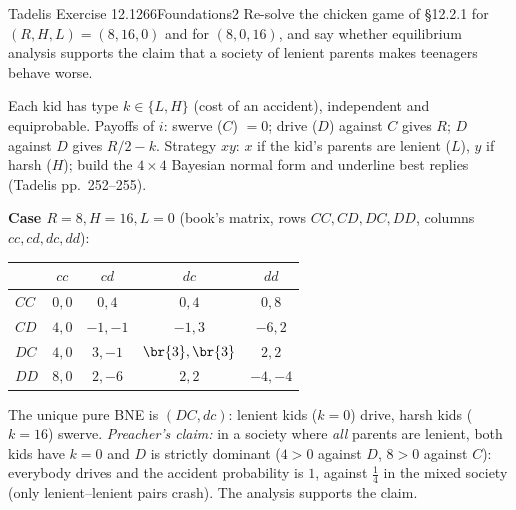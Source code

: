 \begin{exsol}{Tadelis Exercise 12.1}{266}{Foundations}{2}
\asked Re-solve the chicken game of \S12.2.1 for $(R,H,L)=(8,16,0)$ and for $(8,0,16)$, and say
whether equilibrium analysis supports the claim that a society of lenient parents makes
teenagers behave worse.

\method Each kid has type $k\in\{L,H\}$ (cost of an accident), independent and equiprobable.
Payoffs of $i$: swerve ($C$) $=0$; drive ($D$) against $C$ gives $R$; $D$ against $D$ gives
$R/2-k$. Strategy $xy$: $x$ if the kid's parents are lenient ($L$), $y$ if harsh ($H$); build the
$4\times4$ Bayesian normal form and underline best replies (Tadelis pp.~252--255).

\solution
\textbf{Case $R=8,H=16,L=0$} (book's matrix, rows $CC,CD,DC,DD$, columns $cc,cd,dc,dd$):
\begin{center}\small
\begin{tabular}{l|cccc}
 & $cc$ & $cd$ & $dc$ & $dd$\\\hline
$CC$ & $0,0$ & $0,4$ & $0,4$ & $0,8$\\
$CD$ & $4,0$ & $-1,-1$ & $-1,3$ & $-6,2$\\
$DC$ & $4,0$ & $3,-1$ & $\br{3},\br{3}$ & $2,2$\\
$DD$ & $8,0$ & $2,-6$ & $2,2$ & $-4,-4$
\end{tabular}
\end{center}
The unique pure BNE is $(DC,dc)$: lenient kids ($k=0$) drive, harsh kids ($k=16$) swerve.
\emph{Preacher's claim:} in a society where \emph{all} parents are lenient, both kids have
$k=0$ and $D$ is strictly dominant ($4>0$ against $D$, $8>0$ against $C$): everybody drives and
the accident probability is $1$, against $\tfrac14$ in the mixed society (only lenient--lenient
pairs crash). The analysis supports the claim.


\end{exsol}
